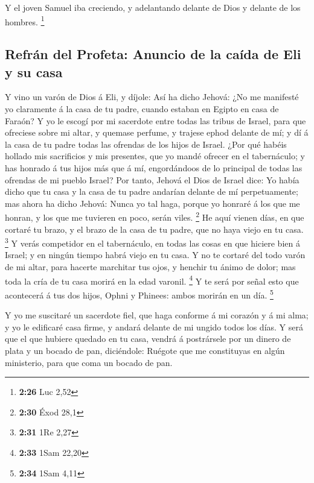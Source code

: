  Y el joven Samuel iba creciendo, y adelantando delante de
Dios y delante de los hombres. \footnote{\textbf{2:26} Luc 2,52}

\hypertarget{refruxe1n-del-profeta-anuncio-de-la-cauxedda-de-eli-y-su-casa}{%
\subsection{Refrán del Profeta: Anuncio de la caída de Eli y su
casa}\label{refruxe1n-del-profeta-anuncio-de-la-cauxedda-de-eli-y-su-casa}}

 Y vino un varón de Dios á Eli, y díjole: Así ha dicho
Jehová: ¿No me manifesté yo claramente á la casa de tu padre, cuando
estaban en Egipto en casa de Faraón?  Y yo le escogí por mi
sacerdote entre todas las tribus de Israel, para que ofreciese sobre mi
altar, y quemase perfume, y trajese ephod delante de mí; y dí á la casa
de tu padre todas las ofrendas de los hijos de Israel. 
¿Por qué habéis hollado mis sacrificios y mis presentes, que yo mandé
ofrecer en el tabernáculo; y has honrado á tus hijos más que á mí,
engordándoos de lo principal de todas las ofrendas de mi pueblo Israel?
 Por tanto, Jehová el Dios de Israel dice: Yo había dicho
que tu casa y la casa de tu padre andarían delante de mí perpetuamente;
mas ahora ha dicho Jehová: Nunca yo tal haga, porque yo honraré á los
que me honran, y los que me tuvieren en poco, serán viles. \footnote{\textbf{2:30}
  Éxod 28,1}  He aquí vienen días, en que cortaré tu brazo,
y el brazo de la casa de tu padre, que no haya viejo en tu casa.
\footnote{\textbf{2:31} 1Re 2,27}  Y verás competidor en el
tabernáculo, en todas las cosas en que hiciere bien á Israel; y en
ningún tiempo habrá viejo en tu casa.  Y no te cortaré del
todo varón de mi altar, para hacerte marchitar tus ojos, y henchir tu
ánimo de dolor; mas toda la cría de tu casa morirá en la edad varonil.
\footnote{\textbf{2:33} 1Sam 22,20}  Y te será por señal
esto que acontecerá á tus dos hijos, Ophni y Phinees: ambos morirán en
un día. \footnote{\textbf{2:34} 1Sam 4,11}

 Y yo me suscitaré un sacerdote fiel, que haga conforme á
mi corazón y á mi alma; y yo le edificaré casa firme, y andará delante
de mi ungido todos los días.  Y será que el que hubiere
quedado en tu casa, vendrá á postrársele por un dinero de plata y un
bocado de pan, diciéndole: Ruégote que me constituyas en algún
ministerio, para que coma un bocado de pan.

